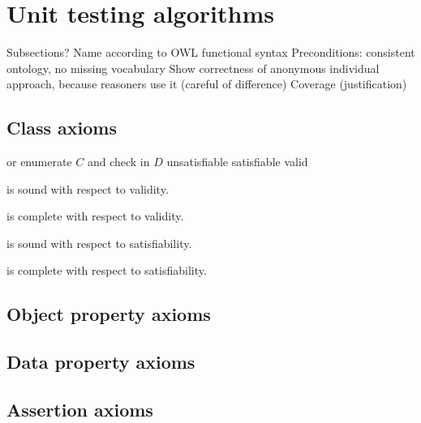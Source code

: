 \documentclass[paper.tex]{subfiles}
\begin{document}
\section{Unit testing algorithms}
\label{sec:algorithms}

\begin{todos}
  \todo Subsections?
  \todo Name according to OWL functional syntax
  \todo Preconditions: consistent ontology, no missing vocabulary
  \todo Show correctness of anonymous individual approach, because reasoners use it (careful of difference)
  \todo Coverage (justification)
\end{todos}

\subsection{Class axioms}

\begin{algorithm}[H]
  \caption{}
  \begin{algorithmic}[1]
        \Comment or enumerate $C$ and check in $D$
        \State \Return unsatisfiable
        \State \Return satisfiable
      \Else
        \State \Return valid
      \EndIf
    \EndFunction
  \end{algorithmic}
\end{algorithm}

\begin{proposition}
   is sound with respect to validity.
\end{proposition}

\begin{proposition}
   is complete with respect to validity.
\end{proposition}

\begin{proposition}
   is sound with respect to satisfiability.
\end{proposition}

\begin{proposition}
   is complete with respect to satisfiability.
\end{proposition}

\subsection{Object property axioms}
\subsection{Data property axioms}
\subsection{Assertion axioms}
\end{document}
